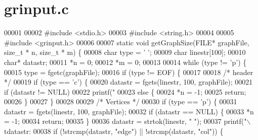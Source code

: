 \section{grinput.\+c}
\label{grinput_8c_source}

\begin{DoxyCode}
00001 
00002 \textcolor{preprocessor}{#include <stdio.h>}
00003 \textcolor{preprocessor}{#include <string.h>}
00004 
00005 \textcolor{preprocessor}{#include <grinput.h>}
00006 
00007 \textcolor{keyword}{static} \textcolor{keywordtype}{void} getGraphSize(FILE* graphFile, \textcolor{keywordtype}{size\_t} * n, \textcolor{keywordtype}{size\_t} * m) \{
00008         \textcolor{keywordtype}{char} type = \textcolor{charliteral}{' '};
00009         \textcolor{keywordtype}{char} linestr[100];
00010         \textcolor{keywordtype}{char}* datastr;
00011         *n = 0;
00012         *m = 0;
00013 
00014         \textcolor{keywordflow}{while} (type != \textcolor{charliteral}{'p'}) \{
00015                 type = fgetc(graphFile);
00016                 \textcolor{keywordflow}{if} (type != EOF) \{
00017 
00018                         \textcolor{comment}{/* header */}
00019                         \textcolor{keywordflow}{if} (type == \textcolor{charliteral}{'c'}) \{
00020                                 datastr = fgets(linestr, 100, graphFile);
00021                                 \textcolor{keywordflow}{if} (datastr != NULL)
00022                                         printf(\textcolor{stringliteral}{"%
00023                                 \textcolor{keywordflow}{else} \{
00024                                         *n = -1;
00025                                         \textcolor{keywordflow}{return};
00026                                 \}
00027                         \}
00028 
00029                         \textcolor{comment}{/* Vertices */}
00030                         \textcolor{keywordflow}{if} (type == \textcolor{charliteral}{'p'}) \{
00031                                 datastr = fgets(linestr, 100, graphFile);
00032                                 \textcolor{keywordflow}{if} (datastr == NULL) \{
00033                                         *n = -1;
00034                                         \textcolor{keywordflow}{return};
00035                                 \}
00036                                 datastr = strtok(linestr, \textcolor{stringliteral}{" "});
00037                                 printf(\textcolor{stringliteral}{"\(\backslash\)tdatastr:%
00038                                 \textcolor{keywordflow}{if} (!strcmp(datastr, \textcolor{stringliteral}{"edge"}) || !strcmp(datastr, \textcolor{stringliteral}{"col"})) \{
}}
\end{DoxyCode}
